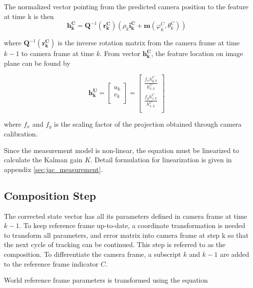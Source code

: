 The normalized vector pointing from the predicted camera position to the 
feature at time k is then 
\begin{equation}
  \mathbf{h_{k}^{C}}=\mathbf{Q}^{-1}\left(\mathbf{r_{k}^{C}}\right)
  \left(\rho_{k}\mathbf{i_{k}^{C}}+
    \mathbf{m}\left(\varphi_k^{C},\theta _{k}^{C}\right)\right)
\end{equation}

\noindent where $\mathbf{Q}^{-1}(\mathbf{r_{k}^{C}})$ is the inverse
rotation matrix from the camera frame at time $k-1$ to camera frame at
time $k$. From vector $\mathbf{h_{k}^{C}}$, the feature location on
image plane can be found by

\begin{equation}
\mathbf{h_{k}^{U}}= \begin{bmatrix}
u_{k} \\
v_{k} \\
\end{bmatrix}=\begin{bmatrix}
\frac{f_{x}h_{y,k}^{C}}{h_{x,k}^{C}} \\
\frac{f_{y}h_{z,k}^{C}}{h_{x,k}^{C}} \\
\end{bmatrix}
\end{equation}

\noindent where $f_{x}$ and $f_{y}$ is the scaling factor of the projection 
obtained through camera calibration.

Since the measurement model is non-linear, the equation must be
linearized to calculate the Kalman gain $K$. Detail formulation for
linearization is given in appendix \ref{sec:jac_measurement}.

\subsection{Composition Step}

The corrected state vector has all its parameters defined in camera
frame at time $k-1$. To keep reference frame up-to-date, a coordinate
transformation is needed to transform all parameters, and error matrix
into camera frame at step k so that the next cycle of tracking can be
continued. This step is referred to as the composition. To
differentiate the camera frame, a subscript $k$ and $k-1$ are added to
the reference frame indicator $C$.

World reference frame parameters is transformed using the equation

